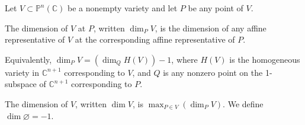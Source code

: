 Let $V \subset \mathbb{P}^n(\mathbb{C})$ be a nonempty variety and let $P$ be any point of $V$.

The dimension of $V$ at $P$, written $\dim_P V$, is the dimension of any affine representative of $V$ at the corresponding affine representative of $P$.

Equivalently, $\dim_P V = (\dim_Q H(V)) - 1$, where $H(V)$ is the homogeneous variety in $\mathbb{C}^{n+1}$ corresponding to $V$, and $Q$ is any nonzero point on the 1-subspace of $\mathbb{C}^{n+1}$ corresponding to $P$.

The dimension of $V$, written $\dim V$, is $\max_{P \in V}(\dim_P V)$. We define $\dim \varnothing = -1$.
